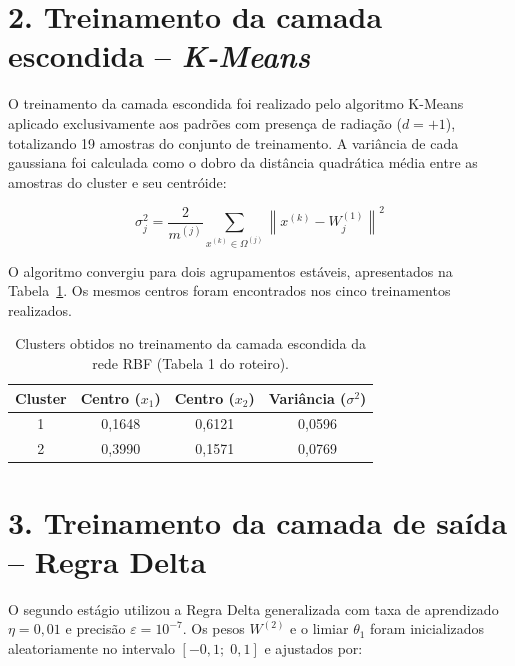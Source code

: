 \documentclass[article, 12pt, oneside, a4paper, section = TITLE, brazil]{abntex2}
\begin{document}
\section*{2. Treinamento da camada escondida – \textit{K-Means}}

O treinamento da camada escondida foi realizado pelo algoritmo K-Means aplicado exclusivamente aos padrões com presença de radiação ($d = +1$), totalizando 19 amostras do conjunto de treinamento. A variância de cada gaussiana foi calculada como o dobro da distância quadrática média entre as amostras do cluster e seu centróide:

\begin{equation*}
    \sigma_j^2 = \frac{2}{m^{(j)}} \sum_{x^{(k)} \in \Omega^{(j)}} \left\|x^{(k)} - W_j^{(1)}\right\|^2
\end{equation*}

O algoritmo convergiu para dois agrupamentos estáveis, apresentados na Tabela~\ref{tab:kmeans}. Os mesmos centros foram encontrados nos cinco treinamentos realizados.

\begin{table}[H]
    \centering
    \caption{Clusters obtidos no treinamento da camada escondida da rede RBF (Tabela 1 do roteiro).}
    \label{tab:kmeans}
    \renewcommand{\arraystretch}{1.3}
    \begin{tabular}{|c|c|c|c|}
        \hline
        \textbf{Cluster} & \textbf{Centro ($x_1$)} & \textbf{Centro ($x_2$)} & \textbf{Variância ($\sigma^2$)} \\
        \hline
        1 & 0,1648 & 0,6121 & 0,0596 \\
        \hline
        2 & 0,3990 & 0,1571 & 0,0769 \\
        \hline
    \end{tabular}
\end{table}

\section*{3. Treinamento da camada de saída – Regra Delta}

O segundo estágio utilizou a Regra Delta generalizada com taxa de aprendizado $\eta = 0{,}01$ e precisão $\varepsilon = 10^{-7}$. Os pesos $W^{(2)}$ e o limiar $\theta_1$ foram inicializados aleatoriamente no intervalo $[-0{,}1;\; 0{,}1]$ e ajustados por:
\end{document}
